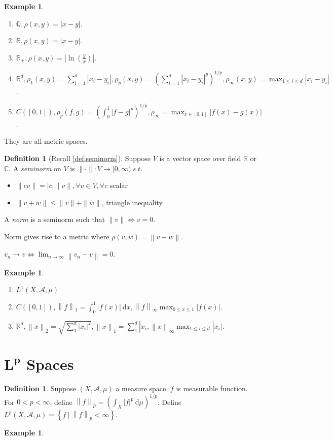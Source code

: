 \documentclass{report}
\newcommand{\R}{\mathbb{R}}
\newcommand{\C}{\mathbb{C}}
\newcommand{\Q}{\mathbb{Q}}
\newcommand{\st}{\ s.t.\ }
\newcommand{\cA}{\mathcal{A}}
\newcommand{\df}{\ \mathrm{d}}
\newcommand{\norm}[1]{\left\| #1 \right\|}
\theoremstyle{definition}
\newtheorem{definition}[theorem]{Definition}
\newtheorem{example}[theorem]{Example}
\theoremstyle{remark}
\newcommand{\fnl}{\parbox[t]{0\linewidth}{}}
\newcommand*\ttlmath[2]{\texorpdfstring{$\boldsymbol{#1}$}{#2}}
\begin{document}
\begin{example} \fnl
	\begin{enumerate}
		\item $\Q, \rho(x, y) = |x - y|$. 
		\item $\R, \rho(x, y) = |x - y|$.
		\item $\displaystyle \R_+, \rho(x, y) = \left| \ln \left(\frac{y}{x}\right) \right|$.
		\item $\displaystyle \R^d, \rho_1(x, y) = \sum_{i=1}^d |x_i - y_i|, \rho_p(x, y) = \left(\sum_{i=1}^d |x_i - y_i|^p\right)^{1/p}, \rho_\infty(x, y) = \max_{1 \leq i \leq d} |x_i - y_i|$.
		\item $\displaystyle C([0, 1]), \rho_p(f, g) = \left(\int_0^1 |f - g|^p\right)^{1/p}, \rho_\infty = \max_{x \in [0, 1]} |f(x) - g(x)|$.
	\end{enumerate}
	They are all metric spaces.
\end{example}

\begin{definition}[Recall \ref{def:seminorm}]
	Suppose $V$ is a vector space over field $\R$ or $\C$. A \emph{seminorm}
	on $V$ is $\|\cdot\|: V \to [0, \infty) \st$
	\begin{itemize}
	\item $\|cv\| = |c|\|v\|, \forall v \in V, \forall c$ scalar
	\item $\|v + w\| \leq \|v\| + \|w\|$, triangle inequality
	\end{itemize}
	A \emph{norm} is a seminorm such that $\|v\| \iff v = 0$.
\end{definition}

Norm gives rise to a metric where $\rho(v, w) = \norm{v - w}$.

$v_n \to v \iff \lim_{n \to \infty}\norm{v_n - v} = 0$.

\begin{example}
	\begin{enumerate}
		\item $L^1(X, \cA, \mu)$
		\item $C([0, 1]), \norm{f}_1 = \int_0^1 |f(x)|\df x, \norm{f}_\infty \max_{0 \leq x \leq 1} |f(x)|$.
		\item $\R^d, \norm{x}_2 = \sqrt{\sum_{1}^d |x_i|^2}, \norm{x}_1 = \sum_{1}^d|x_i, \norm{x}_\infty \max_{1 \leq i \leq d} |x_i|$.
	\end{enumerate}
\end{example}

\section{\ttlmath{L^p}{L\^p} Spaces}
\begin{definition}
	Suppose $(X, \cA, \mu)$ a measure space. $f$ is measurable function. For $0 < p < \infty$, define $\displaystyle \norm{f}_p = \left(\int_{X} |f|^p \df \mu\right)^{1/p}$. Define $L^p(X, \cA, \mu) = \left\lbrace f\ \biggr\rvert\ \norm{f}_p < \infty\right\rbrace$.
\end{definition}
\begin{example}
	
\end{example}
\end{document}
